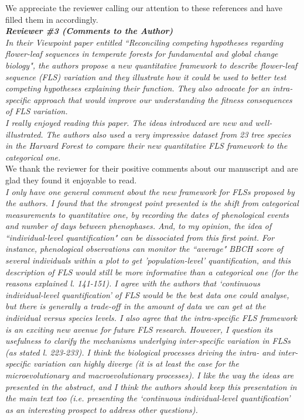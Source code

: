 \documentclass{article}[11pt]
\begin{document}
\noindent We appreciate the reviewer calling our attention to these references and have filled them in accordingly.\\

\emph{{\bf Reviewer \#3 (Comments to the Author)}}\\
\emph{In their Viewpoint paper entitled ``Reconciling competing hypotheses regarding flower-leaf sequences in temperate forests for fundamental and global change biology", the authors propose a new quantitative framework to describe flower-leaf sequence (FLS) variation and they illustrate how it could be used to better test competing hypotheses explaining their function. They also advocate for an intra-specific approach that would improve our understanding the fitness consequences of FLS variation.\\

I really enjoyed reading this paper. The ideas introduced are new and well-illustrated. The authors also used a very impressive dataset from 23 tree species in the Harvard Forest to compare their new quantitative FLS framework to the categorical one.}\\

\noindent We thank the reviewer for their positive comments about our manuscript and are glad they found it enjoyable to read.\\

\emph{I only have one general comment about the new framework for FLSs proposed by the authors. I found that the strongest point presented is the shift from categorical measurements to quantitative one, by recording the dates of phenological events and number of days between phenophases. And, to my opinion, the idea of ``individual-level quantification" can be dissociated from this first point. For instance, phenological observations can monitor the ``average" BBCH score of several individuals within a plot to get 'population-level' quantification, and this description of FLS would still be more informative than a categorical one (for the reasons explained l. 141-151). I agree with the authors that `continuous individual-level quantification' of FLS would be the best data one could analyse, but there is generally a trade-off in the amount of data we can get at the individual versus species levels. I also agree that the intra-specific FLS framework is an exciting new avenue for future FLS research. However, I question its usefulness to clarify the mechanisms underlying inter-specific variation in FLSs (as stated l. 223-233). I think the biological processes driving the intra- and inter-specific variation can highly diverge (it is at least the case for the microevolutionary and macroevolutionary processes). I like the way the ideas are presented in the abstract, and I think the authors should keep this presentation in the main text too (i.e. presenting the  `continuous individual-level quantification' as an interesting prospect to address other questions).}
\end{document}

